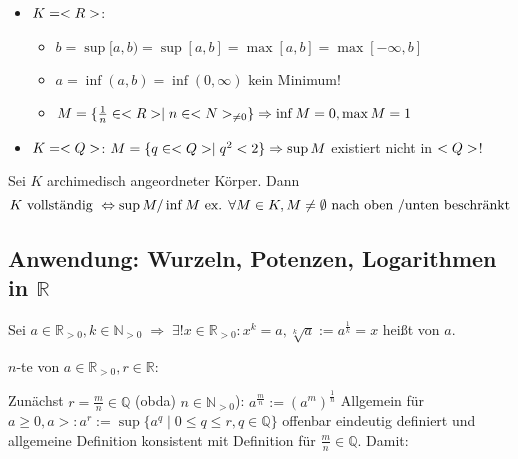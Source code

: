\begin{example}
	\begin{itemize}
		\item $K=<R>$:
			\begin{itemize}
				\item $b = \sup[a,b) = \sup[a,b] = \max[a,b] = \max[-\infty,b]$
				\item $a = \inf(a,b) = \inf(0,\infty)$ kein Minimum!
				\item $M = \{\frac{1}{n} \in <R> \mid n \in <N>_{\neq 0}\} \Rightarrow \inf M = 0, \max M = 1$
			\end{itemize}
		\item $K = <Q>$: 
		$M = \{q \in <Q> \mid q^2 <2\} \Rightarrow \sup M$ existiert nicht in $<Q>$!
	\end{itemize}
\end{example}

\begin{theorem}
	Sei $K$ archimedisch angeordneter Körper. Dann
	\[ K \text{ vollständig } \Leftrightarrow \sup M \slash \inf M \text{ ex. }\forall M\in K, M\neq \emptyset \text{ nach oben \slash unten beschränkt} \]
\end{theorem}



\subsection{Anwendung: Wurzeln, Potenzen, Logarithmen in \texorpdfstring{$\mathbb{R}$}{R}}

\begin{proposition}[Wurzeln]
	Sei $a\in\mathbb{R}_{>0}, k\in\mathbb{N}_{>0} \;\Rightarrow \; \exists ! x\in \mathbb{R}_{>0}: x^k = a, \sqrt[k]{a}:=a^{\frac{1}{k}} = x$ heißt   von $a$.
\end{proposition}

\begin{*definition}[Potenz]
	$n$-te  von $a\in\mathbb{R}_{>0}, r\in\mathbb{R}$:
	
	Zunächst $r=\frac{m}{n}\in\mathbb{Q}$ (\gls{obda}) $n\in\mathbb{N}_{>0}$): $ a^{\frac{m}{n}}:= (a^m)^{\frac{1}{n}}$
	Allgemein für $a\ge 0, a > : a^r := \sup \{ a^q \mid 0 \le q \le r,q\in\mathbb{Q} \}$
	offenbar eindeutig definiert und allgemeine Definition konsistent mit Definition für $\frac{m}{n}\in\mathbb{Q}$.
	Damit: 
\end{*definition}

